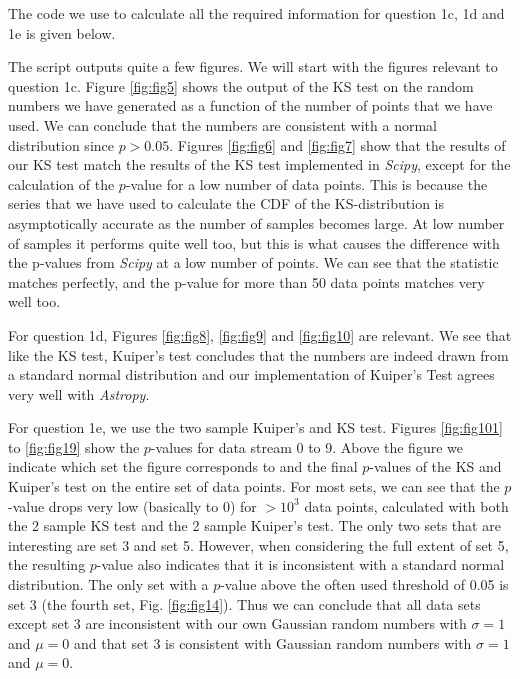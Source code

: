 The code we use to calculate all the required information for question 1c, 1d and 1e is given below.




The script outputs quite a few figures. We will start with the figures relevant to question 1c. Figure \ref{fig:fig5} shows the output of the KS test on the random numbers we have generated as a function of the number of points that we have used. We can conclude that the numbers are consistent with a normal distribution since $p>0.05$. Figures \ref{fig:fig6} and \ref{fig:fig7} show that the results of our KS test match the results of the KS test implemented in \textit{Scipy}, except for the calculation of the $p$-value for a low number of data points. This is because the series that we have used to calculate the CDF of the KS-distribution is asymptotically accurate as the number of samples becomes large. At low number of samples it performs quite well too, but this is what causes the difference with the p-values from \textit{Scipy} at a low number of points. We can see that the statistic matches perfectly, and the p-value for more than 50 data points matches very well too. 

For question 1d, Figures \ref{fig:fig8}, \ref{fig:fig9} and \ref{fig:fig10} are relevant. We see that like the KS test, Kuiper's test concludes that the numbers are indeed drawn from a standard normal distribution and our implementation of Kuiper's Test agrees very well with \textit{Astropy}. 

For question 1e, we use the two sample Kuiper's and KS test. Figures \ref{fig:fig101} to \ref{fig:fig19} show the $p$-values for data stream 0 to 9. Above the figure we indicate which set the figure corresponds to and the final $p$-values of the KS and Kuiper's test on the entire set of data points.
For most sets, we can see that the $p$-value drops very low (basically to 0) for $>10^3$ data points, calculated with both the 2 sample KS test and the 2 sample Kuiper's test. The only two sets that are interesting are set 3 and set 5. However, when considering the full extent of set 5, the resulting $p$-value also indicates that it is inconsistent with a standard normal distribution. The only set with a $p$-value above the often used threshold of 0.05 is set 3 (the fourth set, Fig. \ref{fig:fig14}). Thus we can conclude that all data sets except set 3 are inconsistent with our own Gaussian random numbers with $\sigma=1$ and $\mu=0$ and that set 3 is consistent with Gaussian random numbers with $\sigma=1$ and $\mu=0$.

